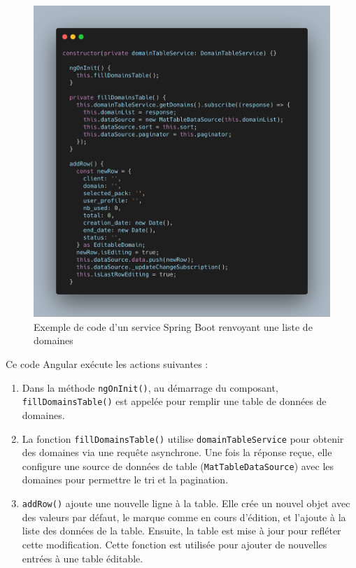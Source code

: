 \documentclass[a4paper, 11pt]{report}
\begin{document}
  \begin{figure}[H]
      \centering
      \includegraphics[scale=0.40,center]{screenshots/js-code.png}
      \caption{Exemple de code d'un service Spring Boot renvoyant une liste de domaines}
  \end{figure}
Ce code Angular exécute les actions suivantes :
\begin{enumerate}
\def\labelenumi{\arabic{enumi}.}
\item
  Dans la méthode \texttt{ngOnInit()}, au démarrage du composant,
  \texttt{fillDomainsTable()} est appelée pour remplir une table de
  données de domaines.
\item
  La fonction \texttt{fillDomainsTable()} utilise
  \texttt{domainTableService} pour obtenir des domaines via une requête
  asynchrone. Une fois la réponse reçue, elle configure une source de
  données de table (\texttt{MatTableDataSource}) avec les domaines pour
  permettre le tri et la pagination.
\item
  \texttt{addRow()} ajoute une nouvelle ligne à la table. Elle crée un
  nouvel objet avec des valeurs par défaut, le marque comme en cours
  d'édition, et l'ajoute à la liste des données de la table. Ensuite, la
  table est mise à jour pour refléter cette modification. Cette fonction
  est utilisée pour ajouter de nouvelles entrées à une table éditable.
\end{enumerate}
\end{document}

